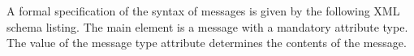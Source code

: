 \documentclass{article}
\begin{document}
  A formal specification of the syntax of messages is given by the following
  XML schema listing. The main element is a message with a mandatory attribute
  type. The value of the message type attribute determines the contents of the
  message.

  \small  \normalsize
   
   


\end{document}
